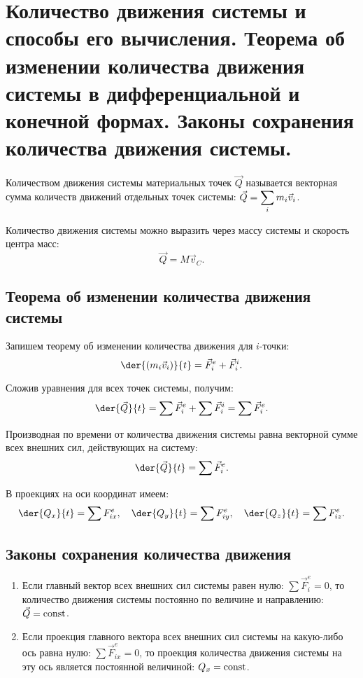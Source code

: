 \chapter{Количество движения системы и способы его вычисления. Теорема об
изменении количества движения системы в дифференциальной и конечной
формах. Законы сохранения количества движения системы.}

Количеством движения системы материальных точек \( \vec{Q} \) называется
векторная сумма количеств движений отдельных точек системы:
\( \displaystyle \vec{Q} = \sum_i m_i\vec{v}_i \).

Количество движения системы можно выразить через массу системы и скорость центра масс:
\[
    \vec{Q} = M\vec{v}_C.
\]

\section{Теорема об изменении количества движения системы}
Запишем теорему об изменении количества движения для \( i \)-точки:
\[
    \der{(m_i\vec{v}_i)}{t} = \vec{F}^e_i + \vec{F}^i_i.
\]

Сложив уравнения для всех точек системы, получим:
\[
    \der{\vec{Q}}{t} = \sum \vec{F}^e_i + \sum \vec{F}^i_i = \sum \vec{F}^e_i.
\]

Производная по времени от количества движения системы равна векторной сумме всех
внешних сил, действующих на систему:
\[
    \der{\vec{Q}}{t} = \sum \vec{F}^e_i.
\]

В проекциях на оси координат имеем:
\[
    \der{Q_x}{t} = \sum F^e_{ix}, \quad \der{Q_y}{t} = \sum F^e_{iy}, \quad
    \der{Q_z}{t} = \sum F^e_{iz}.
\]

\section{Законы сохранения количества движения}
\begin{enumerate}
    \item Если главный вектор всех внешних сил системы равен нулю:
    \( \sum \vec{F}^e_i = 0 \), то количество движения системы постоянно по
    величине и направлению: \( \vec{Q} = \mathrm{const} \).
    \item Если проекция главного вектора всех внешних сил системы на какую-либо
    ось равна нулю: \( \sum \vec{F}^e_{ix} = 0 \), то проекция количества
    движения системы на эту ось является постоянной величиной:
    \( Q_x = \mathrm{const} \).
\end{enumerate}

\newpage
